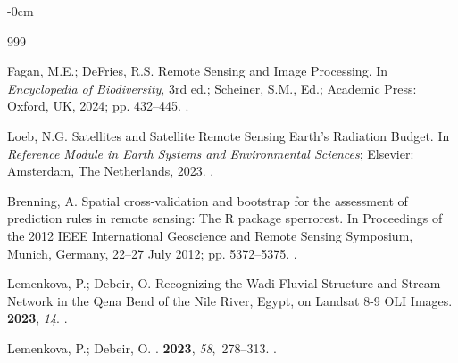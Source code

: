 \documentclass[coasts,article,accept,pdftex,oneauthor]{Definitions/mdpi}
\begin{document}
\begin{adjustwidth}{-\extralength}{0cm}


%


\begin{thebibliography}{999}

Fagan, M.E.; DeFries, R.S.
\newblock Remote Sensing and Image Processing. In {\em Encyclopedia of
  Biodiversity}, 3rd  ed.;  Scheiner, S.M., Ed.;
  Academic Press: Oxford, UK, 2024; pp. 432--445.
.

Loeb, N.G.
\newblock Satellites and Satellite Remote Sensing|Earth's Radiation Budget.
  In {\em Reference Module in Earth Systems and Environmental Sciences};
  Elsevier: Amsterdam, The Netherlands, %
  2023.
.

Brenning, A.
\newblock Spatial cross-validation and bootstrap for the assessment of
  prediction rules in remote sensing: The R package sperrorest.
\newblock In Proceedings of the 2012 IEEE International Geoscience and Remote
  Sensing Symposium, Munich, Germany, 22--27 July 2012; pp. 5372--5375. %
.

Lemenkova, P.; Debeir, O.
\newblock Recognizing the Wadi Fluvial Structure and Stream Network in the Qena
  Bend of the Nile River, Egypt, on Landsat 8-9 OLI Images.
 {\bf 2023}, {\em 14}.
.

Lemenkova, P.; Debeir, O.
.
 {\bf 2023}, {\em 58},~278--313.
.


\end{thebibliography}
\end{adjustwidth}
\end{document}
